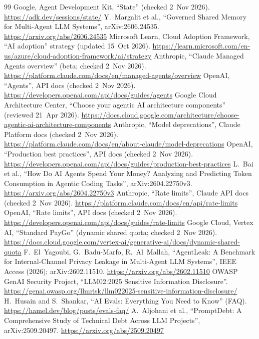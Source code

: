 \documentclass[10pt]{article}
\begin{document}
\begin{thebibliography}{99}
 Google, Agent Development Kit, ``State'' (checked 2~Nov 2026). \url{https://adk.dev/sessions/state/}
 Y.~Margalit et al., ``Governed Shared Memory for Multi-Agent LLM Systems'', arXiv:2606.24535. \url{https://arxiv.org/abs/2606.24535}
 Microsoft Learn, Cloud Adoption Framework, ``AI adoption'' strategy (updated 15~Oct 2026). \url{https://learn.microsoft.com/en-us/azure/cloud-adoption-framework/ai/strategy}
 Anthropic, ``Claude Managed Agents overview'' (beta; checked 2~Nov 2026). \url{https://platform.claude.com/docs/en/managed-agents/overview}
 OpenAI, ``Agents'', API docs (checked 2~Nov 2026). \url{https://developers.openai.com/api/docs/guides/agents}
 Google Cloud Architecture Center, ``Choose your agentic AI architecture components'' (reviewed 21~Apr 2026). \url{https://docs.cloud.google.com/architecture/choose-agentic-ai-architecture-components}
 Anthropic, ``Model deprecations'', Claude Platform docs (checked 2~Nov 2026). \url{https://platform.claude.com/docs/en/about-claude/model-deprecations}
 OpenAI, ``Production best practices'', API docs (checked 2~Nov 2026). \url{https://developers.openai.com/api/docs/guides/production-best-practices}
 L.~Bai et al., ``How Do AI Agents Spend Your Money? Analyzing and Predicting Token Consumption in Agentic Coding Tasks'', arXiv:2604.22750v3. \url{https://arxiv.org/abs/2604.22750v3}
 Anthropic, ``Rate limits'', Claude API docs (checked 2~Nov 2026). \url{https://platform.claude.com/docs/en/api/rate-limits}
 OpenAI, ``Rate limits'', API docs (checked 2~Nov 2026). \url{https://developers.openai.com/api/docs/guides/rate-limits}
 Google Cloud, Vertex AI, ``Standard PayGo'' (dynamic shared quota; checked 2~Nov 2026). \url{https://docs.cloud.google.com/vertex-ai/generative-ai/docs/dynamic-shared-quota}
 F.~El~Yagoubi, G.~Badu-Marfo, R.~Al~Mallah, ``AgentLeak: A Benchmark for Internal-Channel Privacy Leakage in Multi-Agent LLM Systems'', IEEE Access (2026); arXiv:2602.11510. \url{https://arxiv.org/abs/2602.11510}
 OWASP GenAI Security Project, ``LLM02:2025 Sensitive Information Disclosure''. \url{https://genai.owasp.org/llmrisk/llm022025-sensitive-information-disclosure/}
 H.~Husain and S.~Shankar, ``AI Evals: Everything You Need to Know'' (FAQ). \url{https://hamel.dev/blog/posts/evals-faq/}
 A.~Aljohani et al., ``PromptDebt: A Comprehensive Study of Technical Debt Across LLM Projects'', arXiv:2509.20497. \url{https://arxiv.org/abs/2509.20497}

\end{thebibliography}
\end{document}

